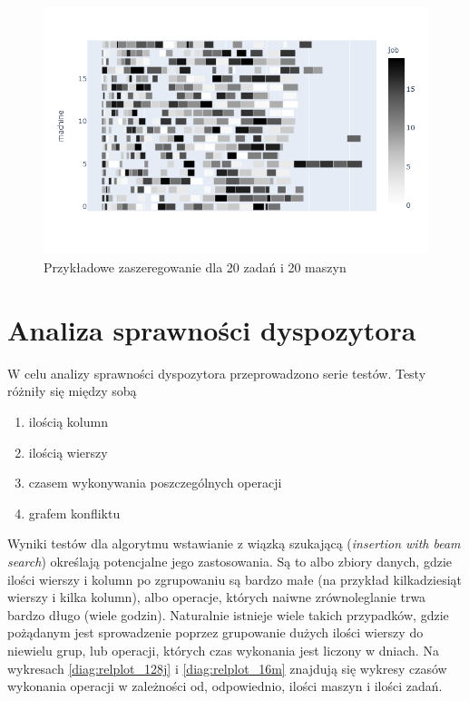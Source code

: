 \documentclass[brudnopis]{xmgr}
\begin{document}
\begin{figure}[!tbh]
\centering
\includegraphics[width=.8\hsize]{fig/newplot_trim20j20m.png}
\caption{Przykładowe zaszeregowanie dla 20 zadań i 20 maszyn\label{diag:sched_20j420}}
\end{figure}
\medskip

\chapter{Analiza sprawności dyspozytora}

W celu analizy sprawności dyspozytora przeprowadzono serie testów.
Testy różniły się między sobą
\begin{enumerate}
    \item ilością kolumn
    \item ilością wierszy
    \item czasem wykonywania poszczególnych operacji
    \item grafem konfliktu
\end{enumerate}

Wyniki testów dla algorytmu wstawianie z wiązką szukającą (\emph{insertion with beam search}) określają potencjalne jego zastosowania. Są to albo zbiory danych, gdzie ilości wierszy i kolumn po zgrupowaniu są bardzo małe (na przykład kilkadziesiąt wierszy i kilka kolumn), albo operacje, których naiwne zrównoleglanie trwa bardzo długo (wiele godzin). Naturalnie istnieje wiele takich przypadków, gdzie pożądanym jest sprowadzenie poprzez grupowanie dużych ilości wierszy do niewielu grup, lub operacji, których czas wykonania jest liczony w dniach. Na wykresach \ref{diag:relplot_128j} i \ref{diag:relplot_16m} znajdują się wykresy czasów wykonania operacji w zależności od, odpowiednio, ilości maszyn i ilości zadań.
\end{document}
